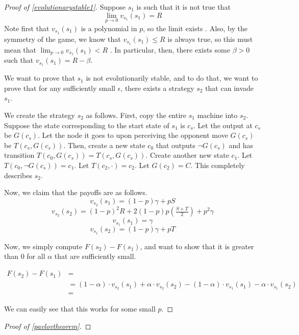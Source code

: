 \documentclass[11pt]{amsart}
\theoremstyle{definition}
\theoremstyle{remark}
\begin{document}
    \begin{proof}[Proof of \cref{evolutionarystable1}]
      Suppose $s_1$ is such that it is not true that \begin{equation*}
        \lim_{p \to 0 } v_{s_1}(s_1) = R
      \end{equation*}
      Note first that $v_{s_1}(s_1)$ is a polynomial in $p$, so the limit exists . Also, by the symmetry of the game, we know that $v_{s_1}(s_1) \leq R$ is always true, so this must mean that $\lim_{p \to 0} v_{s_1}(s_1) < R$ . In particular, then, there exists some $\beta > 0$ such that $v_{s_1}(s_1) = R - \beta$.
      
      We want to prove that $s_1$ is not evolutionarily stable, and to do that, we want to prove that for any sufficiently small $\epsilon$, there exists a strategy $s_2$ that can invade $s_1$.

      We create the strategy $s_2$ as follows. First, copy the entire $s_1$ machine into $s_2$. Suppose the state corresponding to the start state of $s_1$ is $c_s$. Let the output at $c_s$ be $G(c_s)$. Let the node it goes to upon perceiving the opponent move $G(c_s)$ be $T(c_s, G(c_s))$. Then, create a new state $c_0$ that outputs $\lnot G(c_s)$ and has transition $T(c_0, G(c_s)) = T(c_s, G(c_s))$. Create another new state $c_1$. Let $T(c_0, \lnot G(c_s)) = c_1$. Let $T(c_2, \cdot) = c_2$. Let $G(c_2) = C$. This completely describes $s_2$.

      Now, we claim that the payoffs are as follows.
      \begin{equation}
        v_{s_2}(s_1) = (1 - p) \gamma  + p S
      \end{equation}
      \begin{equation}
        v_{s_2}(s_2) = (1-p)^{2} R + 2 (1-p) p (\tfrac{S + T}{2}) + p^2 \gamma
      \end{equation}
      \begin{equation}
        v_{s_1}(s_1) = \gamma
      \end{equation}
      \begin{equation}
        v_{s_1}(s_2) = (1-p) \gamma + p T
      \end{equation}

      Now, we simply compute $F(s_2) - F(s_1)$, and want to show that it is greater than 0 for all $\alpha$ that are sufficiently small.

      \begin{align*}
        F(s_2) - F(s_1) &= \\
        &= (1 - \alpha) \cdot v_{s_2}(s_1) + \alpha \cdot v_{s_2}(s_2) - (1 - \alpha) \cdot v_{s_1}(s_1) - \alpha \cdot v_{s_1}(s_2) \\
        &= 
      \end{align*}

      We can easily see that this works for some small $p$.

    \end{proof}


    \begin{proof}[Proof of \cref{pavlovtheorem}]


    \end{proof}
\end{document}

